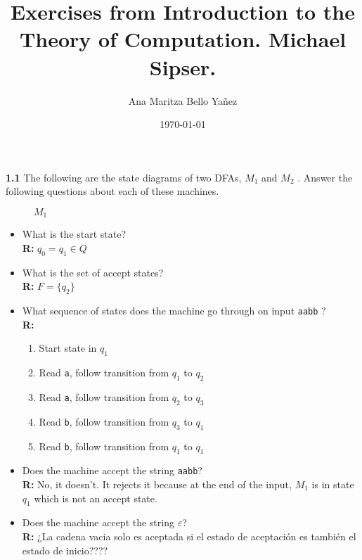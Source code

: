 \documentclass{article}
\title{Exercises from Introduction to the Theory of Computation. Michael Sipser.}
\author{Ana Maritza Bello Yañez}
\date{\today}
\begin{document}
\maketitle

\textbf{1.1} The following are the state diagrams of two DFAs, $M_1$ and $M_2$ . Answer
the following questions about each of these machines.


\begin{figure}[h!]
\centering
\caption{$M_1$}
\end{figure}
    

\begin{itemize}

\item What is the start state? \\
\textbf{R: } $q_0 = q_1 \in Q$

\item What is the set of accept states? \\
\textbf{R: } $F = \{q_2\}$

\item What sequence of states does the machine go through on input \texttt{aabb}
? \\
\textbf{R: }
\begin{enumerate}
    \item Start state in $q_1$
    \item Read \texttt{a}, follow transition from $q_1$ to $q_2$
    \item Read \texttt{a}, follow transition from $q_2$ to $q_3$
    \item Read \texttt{b}, follow transition from $q_3$ to $q_1$
    \item Read \texttt{b}, follow transition from $q_1$ to $q_1$
\end{enumerate}

\item Does the machine accept the string \texttt{aabb}? \\
\textbf{R: } No, it doesn't. It rejects it because at the end of the input,
$M_1$ is in state $q_1$ which is not an accept state.

\item Does the machine accept the string $\varepsilon$? \\
\textbf{R: } ¿La cadena vacia solo es aceptada si el estado de aceptación es
también el estado de inicio????

\end{itemize}
\end{document}
